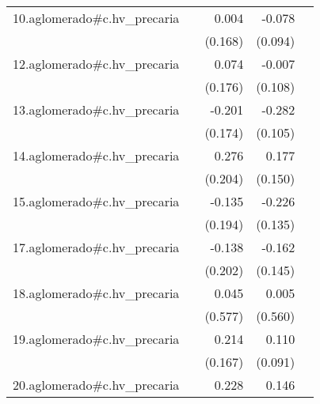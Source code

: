 {\begin{longtable}{l*{4}{D{.}{.}{-1}}}
\addlinespace
10.aglomerado#c.hv\_precaria&                     &       0.004         &      -0.078         &                     \\
            &                     &     (0.168)         &     (0.094)         &                     \\
\addlinespace
12.aglomerado#c.hv\_precaria&                     &       0.074         &      -0.007         &                     \\
            &                     &     (0.176)         &     (0.108)         &                     \\
\addlinespace
13.aglomerado#c.hv\_precaria&                     &      -0.201         &      -0.282\sym{**} &                     \\
            &                     &     (0.174)         &     (0.105)         &                     \\
\addlinespace
14.aglomerado#c.hv\_precaria&                     &       0.276         &       0.177         &                     \\
            &                     &     (0.204)         &     (0.150)         &                     \\
\addlinespace
15.aglomerado#c.hv\_precaria&                     &      -0.135         &      -0.226         &                     \\
            &                     &     (0.194)         &     (0.135)         &                     \\
\addlinespace
17.aglomerado#c.hv\_precaria&                     &      -0.138         &      -0.162         &                     \\
            &                     &     (0.202)         &     (0.145)         &                     \\
\addlinespace
18.aglomerado#c.hv\_precaria&                     &       0.045         &       0.005         &                     \\
            &                     &     (0.577)         &     (0.560)         &                     \\
\addlinespace
19.aglomerado#c.hv\_precaria&                     &       0.214         &       0.110         &                     \\
            &                     &     (0.167)         &     (0.091)         &                     \\
\addlinespace
20.aglomerado#c.hv\_precaria&                     &       0.228         &       0.146         &                     \\

\end{longtable}}
